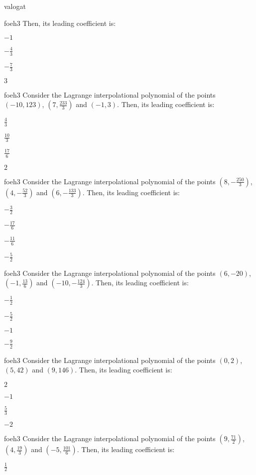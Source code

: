 \documentclass[12pt]{article}
\begin{document}
\begin{quiz}{valogat}
\begin{multi}{foeh3}
Then, its leading coefficient is:
\item* $ -1 $
\item  $ -\frac{4}{3} $
\item  $ -\frac{7}{3} $
\item  $ 3 $
\end{multi}
\begin{multi}{foeh3}
Consider the Lagrange interpolational polynomial of the points $(-10,123)$, $(7,\frac{233}{3})$ and $(-1,3)$.
Then, its leading coefficient is:
\item* $ \frac{4}{3} $
\item  $ \frac{10}{3} $
\item  $ \frac{17}{6} $
\item  $ 2 $
\end{multi}
\begin{multi}{foeh3}
Consider the Lagrange interpolational polynomial of the points $(8,-\frac{250}{3})$, $(4,-\frac{52}{3})$ and $(6,-\frac{133}{3})$.
Then, its leading coefficient is:
\item* $ -\frac{3}{2} $
\item  $ -\frac{17}{6} $
\item  $ -\frac{11}{6} $
\item  $ -\frac{5}{2} $
\end{multi}
\begin{multi}{foeh3}
Consider the Lagrange interpolational polynomial of the points $(6,-20)$, $(-1,\frac{13}{6})$ and $(-10,-\frac{124}{3})$.
Then, its leading coefficient is:
\item* $ -\frac{1}{2} $
\item  $ -\frac{5}{2} $
\item  $ -1 $
\item  $ -\frac{9}{2} $
\end{multi}
\begin{multi}{foeh3}
Consider the Lagrange interpolational polynomial of the points $(0,2)$, $(5,42)$ and $(9,146)$.
Then, its leading coefficient is:
\item* $ 2 $
\item  $ -1 $
\item  $ \frac{5}{3} $
\item  $ -2 $
\end{multi}
\begin{multi}{foeh3}
Consider the Lagrange interpolational polynomial of the points $(9,\frac{71}{2})$, $(4,\frac{19}{3})$ and $(-5,\frac{101}{6})$.
Then, its leading coefficient is:
\item* $ \frac{1}{2} $

\end{multi}
\end{quiz}
\end{document}
